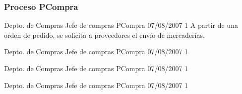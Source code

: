 \subsubsection{Proceso \textsf{PCompra}}

\begin{apx1}
{Depto. de Compras}
{Jefe de compras}
{PCompra}
{07/08/2007}
{1}
{A partir de una orden de pedido, se solicita a proveedores el envío de mercaderías.}
\end{apx1}

\begin{apx2}
{Depto. de Compras}
{Jefe de compras}
{PCompra}
{07/08/2007}
{1}
\end{apx2}

\begin{apx3}
{Depto. de Compras}
{Jefe de compras}
{PCompra}
{07/08/2007}
{1}
\end{apx3}

\begin{apx4}
{Depto. de Compras}
{Jefe de compras}
{PCompra}
{07/08/2007}
{1}
\end{apx4}

